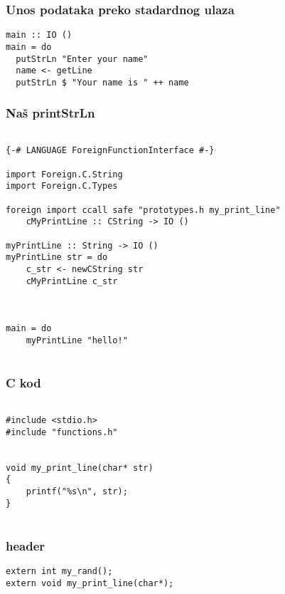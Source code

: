 \documentclass{beamer}
\begin{document}
\begin{frame}[fragile]
\frametitle{Unos podataka preko stadardnog ulaza}
\begin{lstlisting}
main :: IO ()
main = do
  putStrLn "Enter your name"
  name <- getLine
  putStrLn $ "Your name is " ++ name
\end{lstlisting}
\end{frame}



\begin{frame}[fragile]
\frametitle{Naš printStrLn} 
\begin{lstlisting}

{-# LANGUAGE ForeignFunctionInterface #-}

import Foreign.C.String
import Foreign.C.Types 

foreign import ccall safe "prototypes.h my_print_line"
    cMyPrintLine :: CString -> IO ()

myPrintLine :: String -> IO () 
myPrintLine str = do 
    c_str <- newCString str
    cMyPrintLine c_str



main = do 
    myPrintLine "hello!"


\end{lstlisting}
\end{frame}

\begin{frame}[fragile]
\frametitle{C kod}
\begin{lstlisting}

#include <stdio.h>
#include "functions.h"


void my_print_line(char* str) 
{
	printf("%s\n", str);
}


\end{lstlisting}
\end{frame}

\begin{frame}[fragile]
\frametitle{header}
\begin{lstlisting}
extern int my_rand();
extern void my_print_line(char*);
\end{lstlisting}
\end{frame}
\end{document}
